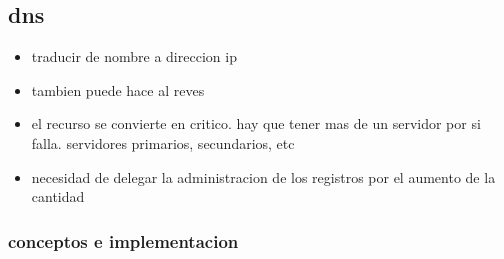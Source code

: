 \documentclass[11pt]{article}
\begin{document}
\subsection{dns}
\label{sec:org77114a7}
\begin{itemize}
\item traducir de nombre a direccion ip
\item tambien puede hace al reves
\item el recurso se convierte en critico. hay que tener mas de un servidor por si falla. servidores primarios, secundarios, etc
\item necesidad de delegar la administracion de los registros por el aumento de la cantidad
\end{itemize}
\subsubsection{conceptos e implementacion}
\label{sec:org5379880}
\end{document}
